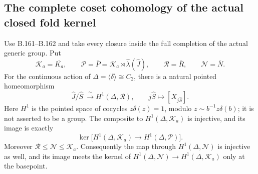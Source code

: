 \subsection*{The complete coset cohomology of the actual closed fold kernel}
\label{stmt:B163}
Use B.161--B.162 and take every closure inside the full completion of
the actual generic group. Put
\[
 \mathcal K_a=\overline{K_a},\qquad
 \mathcal P=\overline P=\mathcal K_a\rtimes
                   \widehat\lambda(\widehat J),\qquad
 \mathcal R=\overline R,\qquad \mathcal N=\overline N.
\]
For the continuous action of $\Delta=\langle\delta\rangle\cong C_2$,
there is a natural pointed homeomorphism
\begin{equation}\label{eq:B163-H1}
 \widehat J/\widehat S\ \xrightarrow{\ \sim\ }
 H^1(\Delta,\mathcal R),\qquad
 j\widehat S\longmapsto[X_{j\widehat S}].
\end{equation}
Here $H^1$ is the pointed space of cocycles $z\delta(z)=1$, modulo
$z\sim b^{-1}z\delta(b)$; it is not asserted to be a group.
The composite to $H^1(\Delta,\mathcal K_a)$ is injective, and its
image is exactly
\begin{equation}\label{eq:B163-image}
 \ker\bigl[H^1(\Delta,\mathcal K_a)
                 \longrightarrow H^1(\Delta,\mathcal P)\bigr].
\end{equation}
Moreover $\mathcal R\le\mathcal N\le\mathcal K_a$. Consequently
the map through $H^1(\Delta,\mathcal N)$ is injective as well, and
its image meets the kernel of
$H^1(\Delta,\mathcal N)\to H^1(\Delta,\mathcal K_a)$ only at the
basepoint.
